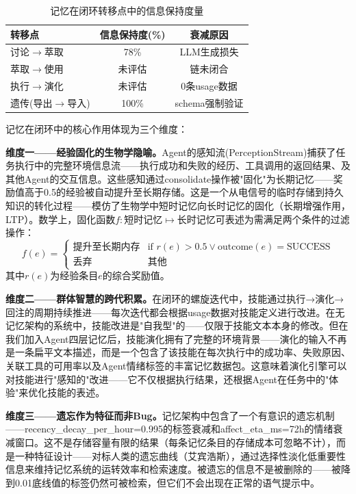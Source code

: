 \documentclass[twocolumn,10.5pt]{ctexart}
\begin{document}
\begin{table}[t]
\centering
\caption{记忆在闭环转移点中的信息保持度量}
\label{tab:mem_loop}
\setlength{\tabcolsep}{2pt}
\renewcommand{\arraystretch}{1.1}
\begin{tabular}{lcc}
\toprule
转移点 & 信息保持度(\%) & 衰减原因 \\
\midrule
讨论$\rightarrow$萃取 & 78\% & LLM生成损失 \\
萃取$\rightarrow$使用 & 未评估 & 链未闭合 \\
执行$\rightarrow$演化 & 未评估 & 0条usage数据 \\
遗传(导出$\rightarrow$导入) & 100\% & schema强制验证 \\
\bottomrule
\end{tabular}
\end{table}

记忆在闭环中的核心作用体现为三个维度：

\textbf{维度一——经验固化的生物学隐喻。}Agent的感知流(PerceptionStream)捕获了任务执行中的完整环境信息流——执行成功和失败的经历、工具调用的返回结果、及其他Agent的交互信息。这些感知通过consolidate操作被"固化"为长期记忆——奖励值高于0.5的经验被自动提升至长期存储。这是一个从电信号的临时存储到持久知识的转化过程——模仿了生物学中短时记忆向长时记忆的固化（长期增强作用，LTP）。数学上，固化函数$f: \text{短时记忆} \mapsto \text{长时记忆}$可表述为需满足两个条件的过滤操作：
\begin{equation}
  f(e) = \begin{cases}
    \text{提升至长期内存} & \text{if } r(e) > 0.5 \lor \text{outcome}(e) = \text{SUCCESS} \\
    \text{丢弃} & \text{其他}
  \end{cases}
\end{equation}
其中$r(e)$为经验条目$e$的综合奖励值。

\textbf{维度二——群体智慧的跨代积累。}在闭环的螺旋迭代中，技能通过执行→演化→回注的周期持续推进——每次迭代都会根据usage数据对技能定义进行改进。在无记忆架构的系统中，技能改进是"自我型"的——仅限于技能文本本身的修改。但在我们加入Agent四层记忆后，技能演化拥有了完整的环境背景——演化的输入不再是一条扁平文本描述，而是一个包含了该技能在每次执行中的成功率、失败原因、关联工具的可用率以及Agent情绪标签的丰富记忆数据包。这意味着演化引擎可以对技能进行"感知的"改进——它不仅根据执行结果，还根据Agent在任务中的"体验"来优化技能的表述。

\textbf{维度三——遗忘作为特征而非Bug。}记忆架构中包含了一个有意识的遗忘机制——recency\_decay\_per\_hour=0.995的标签衰减和affect\_eta\_ms=72h的情绪衰减窗口。这不是存储容量有限的结果（每条记忆条目的存储成本可忽略不计），而是一种特征设计——对标人类的遗忘曲线（艾宾浩斯），通过选择性淡化低重要性信息来维持记忆系统的运转效率和检索速度。被遗忘的信息不是被删除的——被降到0.01底线值的标签仍然可被检索，但它们不会出现在正常的语气提示中。
\end{document}
